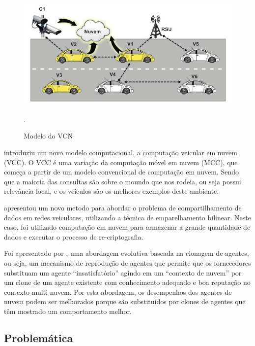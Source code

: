 \documentclass[
	12pt,				%
	oneside,			%
	a4paper,			%
	english,			%
	brazil				%
	]{abntex2ppgsi}
\begin{document}
\begin{figure}[h!]
	\centering
	\includegraphics[width=0.7\columnwidth]{images/vcn.png}
	\caption{Modelo do VCN \cite{lee2014vehicular}}.
	\label{fig:vcn}
\end{figure}

  introduziu um novo modelo computacional, a computação veicular em nuvem  (VCC). O VCC é uma variação da computação móvel em nuvem (MCC), que começa a partir de um modelo convencional de computação em nuvem. Sendo que a maioria das consultas são sobre o moundo que nos rodeia, ou seja possui relevância local, e os veículos são os melhores exemplos deste ambiente.

 apresentou um novo metodo para abordar o problema de compartilhamento de dados em redes veiculares, utilizando a técnica de emparelhamento bilinear. Neste caso, foi utilizado computação em nuvem para armazenar a grande quantidade de dados e executar o processo de re-criptografia.

 Foi apresentado por , uma abordagem evolutiva baseada na clonagem de agentes, ou seja, um mecanismo de reprodução de agentes que permite que os fornecedores substituam um agente ``insatisfatório'' agindo em um ``contexto de nuvem'' por um clone de um agente existente com conhecimento adequado e boa reputação no contexto multi-nuvem. Por esta abordagem, os desempenhos dos agentes de nuvem podem ser melhorados porque são substituídos por clones de agentes que têm mostrado um comportamento melhor.

%

\subsection{Problemática}
\end{document}
